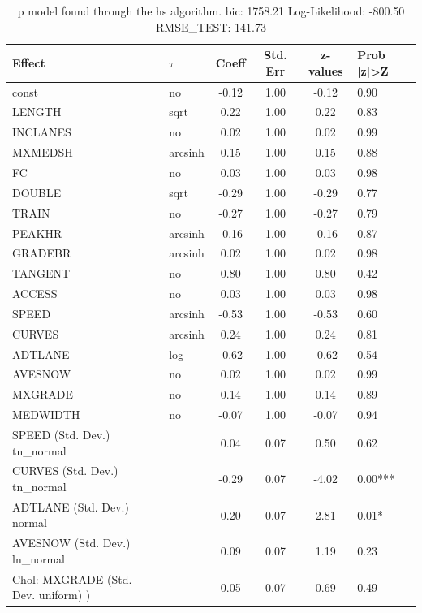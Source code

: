 \begin{table}
	\caption{p model found through the hs algorithm. bic: 1758.21 Log-Likelihood: -800.50 RMSE_TEST: 141.73}
	\begin{center}
		\begin{tabular}{|l|l|c|c|c|l|}
			\hline
			Effect & $\tau$ & Coeff & Std. Err & z-values & Prob |z|>Z \\
			\hline
			const & no & -0.12 & 1.00 & -0.12 & 0.90 \\
			\hline
			LENGTH & sqrt & 0.22 & 1.00 & 0.22 & 0.83 \\
			\hline
			INCLANES & no & 0.02 & 1.00 & 0.02 & 0.99 \\
			\hline
			MXMEDSH & arcsinh & 0.15 & 1.00 & 0.15 & 0.88 \\
			\hline
			FC & no & 0.03 & 1.00 & 0.03 & 0.98 \\
			\hline
			DOUBLE & sqrt & -0.29 & 1.00 & -0.29 & 0.77 \\
			\hline
			TRAIN & no & -0.27 & 1.00 & -0.27 & 0.79 \\
			\hline
			PEAKHR & arcsinh & -0.16 & 1.00 & -0.16 & 0.87 \\
			\hline
			GRADEBR & arcsinh & 0.02 & 1.00 & 0.02 & 0.98 \\
			\hline
			TANGENT & no & 0.80 & 1.00 & 0.80 & 0.42 \\
			\hline
			ACCESS & no & 0.03 & 1.00 & 0.03 & 0.98 \\
			\hline
			SPEED & arcsinh & -0.53 & 1.00 & -0.53 & 0.60 \\
			\hline
			CURVES & arcsinh & 0.24 & 1.00 & 0.24 & 0.81 \\
			\hline
			ADTLANE & log & -0.62 & 1.00 & -0.62 & 0.54 \\
			\hline
			AVESNOW & no & 0.02 & 1.00 & 0.02 & 0.99 \\
			\hline
			MXGRADE & no & 0.14 & 1.00 & 0.14 & 0.89 \\
			\hline
			MEDWIDTH & no & -0.07 & 1.00 & -0.07 & 0.94 \\
			\hline
			SPEED (Std. Dev.) tn_normal &  & 0.04 & 0.07 & 0.50 & 0.62 \\
			\hline
			CURVES (Std. Dev.) tn_normal &  & -0.29 & 0.07 & -4.02 & 0.00*** \\
			\hline
			ADTLANE (Std. Dev.) normal &  & 0.20 & 0.07 & 2.81 & 0.01* \\
			\hline
			AVESNOW (Std. Dev.) ln_normal &  & 0.09 & 0.07 & 1.19 & 0.23 \\
			\hline
			 Chol: MXGRADE (Std. Dev. uniform) ) &  & 0.05 & 0.07 & 0.69 & 0.49 \\

\end{tabular}
\end{center}
\end{table}
